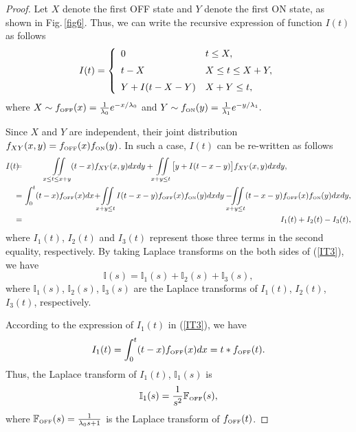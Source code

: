 \documentclass[11pt,draftcls]{IEEEtran}{\onecolumn}
\begin{document}
\begin{proof}
Let $X$ denote the first OFF state and $Y$ denote the first ON
state, as shown in Fig.\,\ref{fig6}. Thus, we can write the
recursive expression of function $I(t)$ as follows
\begin{equation}
I(t)=\left\{ \begin{array}{ll} 0 & t\le X, \vspace{2mm}\\
t-X &
X\le t \le X+Y, \vspace{2mm}\\
Y+I(t-X-Y)& X+Y \le t,
\end{array}\right.\label{IT4}
\end{equation}
where $X\sim f_{\mbox{\tiny{OFF}}}(x)= \frac{1}{\lambda_0}
e^{-x/\lambda_0} \vspace{2mm}$ and $Y\sim f_{\mbox{\tiny{ON}}}(y)=
\frac{1}{\lambda_1} e^{-y/\lambda_1}.$

Since $X$ and $Y$ are independent, their joint distribution
$f_{XY}(x,y)=f_{\mbox{\tiny{OFF}}}(x)f_{\mbox{\tiny{ON}}}(y)$. In
such a case, $I(t)$ can be re-written as follows
\begin{eqnarray}
I(t)\!\!\!\!&=&\!\!\!\!\!\!\iint\limits_{x\le t\le x+y}(t-x)f_{XY}(x,y)dxdy
+\iint\limits_{x+y\le t} \big[y+I(t-x-y)\big]f_{XY}(x,y)dxdy,\quad\quad\quad\quad\quad\quad\quad\quad\nonumber\\
\!\!\!\!&=&\!\!\!\!\int_0^t(t-x)f_{\mbox{\tiny{OFF}}}(x)dx \!+\!\! \iint\limits_{x+y \le t}I(t-x-y)f_{\mbox{\tiny{OFF}}}(x)f_{\mbox{\tiny{ON}}}(y)dxdy
-\!\!\!\iint\limits_{x+y\le t} (t-x-y)f_{\mbox{\tiny{OFF}}}(x)f_{\mbox{\tiny{ON}}}(y)dxdy,\nonumber\\
\!\!\!\!&=&I_1(t)+I_2(t)-I_3(t)\label{IT3},
\end{eqnarray}
where $I_1(t)$, $I_2(t)$ and $I_3(t)$ represent those three terms in
the second equality, respectively. By taking Laplace transforms on
the both sides of (\ref{IT3}), we have
\begin{equation}
\mathbb{I}(s)=\mathbb{I}_1(s)+\mathbb{I}_2(s)+\mathbb{I}_3(s),\label{IS0}
\end{equation}
where $\mathbb{I}_1(s)$, $\mathbb{I}_2(s)$, $\mathbb{I}_3(s)$ are
the Laplace transforms of $I_1(t)$, $I_2(t)$, $I_3(t)$,
respectively.

According to the expression of $I_1(t)$ in (\ref{IT3}), we have
\begin{equation}
I_1(t)=\int_0^t(t-x)f_{\mbox{\tiny{OFF}}}(x)dx=t\ast f_{\mbox{\tiny{OFF}}}(t).
\end{equation}
Thus, the Laplace transform of $I_1(t)$, $\mathbb{I}_1(s)$ is
\begin{equation}
\mathbb{I}_1(s)= \frac{1}{s^2}\mathbb{F}_{\mbox{\tiny{OFF}}}(s),\label{I1S}
\end{equation}
where $\mathbb{F}_{\mbox{\tiny{OFF}}}(s)=\frac{1}{\lambda_0s+1}$ is
the Laplace transform of $f_{\mbox{\tiny{OFF}}}(t)$.


\end{proof}
\end{document}
